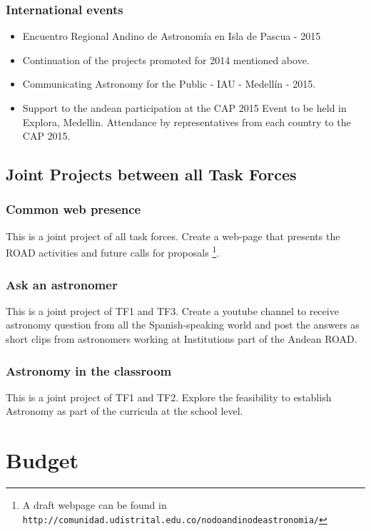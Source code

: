 \documentclass[12pt]{article}
\begin{document}
\subsubsection*{International events}


\begin{itemize}
\item Encuentro Regional Andino de Astronomía en Isla de Pascua - 2015
\item Continuation of the projects promoted for 2014 mentioned above.
\item Communicating Astronomy for the Public - IAU - Medellín - 2015.
\item Support to the andean participation at the CAP 2015 Event to be
  held in Explora, Medellin. Attendance by representatives from each
  country to the CAP 2015.
\end{itemize}

\subsection{Joint Projects between all Task Forces} 

\subsubsection*{Common web presence}
This is a joint project of all task forces. Create a web-page that
presents the ROAD activities and future calls for
proposals \footnote{A draft webpage can be found in
  \texttt{http://comunidad.udistrital.edu.co/nodoandinodeastronomia/}}. 

\subsubsection*{Ask an astronomer}
This is a joint project of TF1 and TF3. Create a youtube channel to
receive astronomy question from all the Spanish-speaking world and
post the answers as short clips from astronomers working at
Institutions part of the Andean ROAD. 

\subsubsection*{Astronomy in the classroom}
This is a joint project of TF1 and TF2. Explore the feasibility to
establish Astronomy as part of the curricula at the school level.  

\section{Budget}
\end{document}
